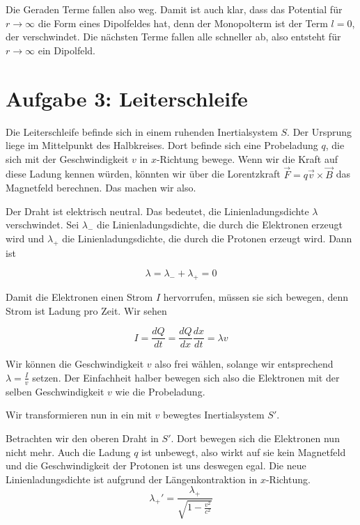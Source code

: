 \documentclass[a4paper,german,12pt,smallheadings]{scrartcl}
\begin{document}
Die Geraden Terme fallen also weg. Damit ist auch klar, dass das Potential für
$r \to \infty$ die Form eines Dipolfeldes hat, denn der Monopolterm ist der
Term $l=0$, der verschwindet. Die nächsten Terme fallen alle schneller ab, also
entsteht für $r \to \infty$ ein Dipolfeld.


\section*{Aufgabe 3: Leiterschleife}

Die Leiterschleife befinde sich in einem ruhenden Inertialsystem $S$. Der
Ursprung liege im Mittelpunkt des Halbkreises. Dort befinde sich eine
Probeladung $q$, die sich mit der Geschwindigkeit $v$ in $x$-Richtung bewege.
Wenn wir die Kraft auf diese Ladung kennen würden, könnten wir über die
Lorentzkraft $\vec{F} = q\vec{v} \times \vec{B}$ das Magnetfeld berechnen. Das
machen wir also.

Der Draht ist elektrisch neutral. Das bedeutet, die Linienladungsdichte
$\lambda$ verschwindet. Sei $\lambda_-$ die Linienladungsdichte, die durch die
Elektronen erzeugt wird und $\lambda_+$ die Linienladungsdichte, die durch die
Protonen erzeugt wird. Dann ist

\begin{equation}
  \lambda = \lambda_- + \lambda_+ = 0
\end{equation}

Damit die Elektronen einen Strom $I$ hervorrufen, müssen sie sich bewegen, denn
Strom ist Ladung pro Zeit. Wir sehen

\begin{equation}
  I = \frac{dQ}{dt} = \frac{dQ}{dx} \frac{dx}{dt} = \lambda v
\end{equation}

Wir können die Geschwindigkeit $v$ also frei wählen, solange wir entsprechend
$\lambda = \frac{I}{v}$ setzen. Der Einfachheit halber bewegen sich also die
Elektronen mit der selben Geschwindigkeit $v$ wie die Probeladung.

Wir transformieren nun in ein mit $v$ bewegtes Inertialsystem $S'$.

Betrachten wir den oberen Draht in $S'$. Dort bewegen sich die Elektronen nun
nicht mehr. Auch die Ladung $q$ ist unbewegt, also wirkt auf sie kein
Magnetfeld und die Geschwindigkeit der Protonen ist uns deswegen egal. Die neue
Linienladungsdichte ist aufgrund der Längenkontraktion in $x$-Richtung.
\begin{equation}
  \lambda_+' = \frac{\lambda_+}{\sqrt{1 - \frac{v^2}{c^2}}}
\end{equation}
\end{document}
